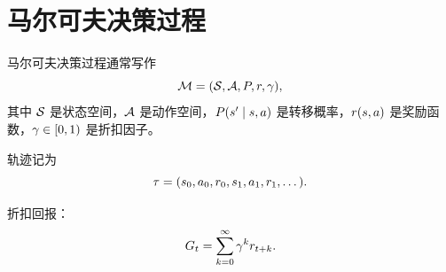 \section{马尔可夫决策过程}

\begin{definitionbox}[MDP]
马尔可夫决策过程通常写作
\[
  \mathcal{M}=(\mathcal{S},\mathcal{A},P,r,\gamma),
\]
其中 $\mathcal{S}$ 是状态空间，$\mathcal{A}$ 是动作空间，$P(s'\mid s,a)$ 是转移概率，$r(s,a)$ 是奖励函数，$\gamma\in[0,1)$ 是折扣因子。
\end{definitionbox}

轨迹记为
\[
  \tau=(s_0,a_0,r_0,s_1,a_1,r_1,\dots).
\]

折扣回报：
\[
  G_t=\sum_{k=0}^{\infty}\gamma^k r_{t+k}.
\]
